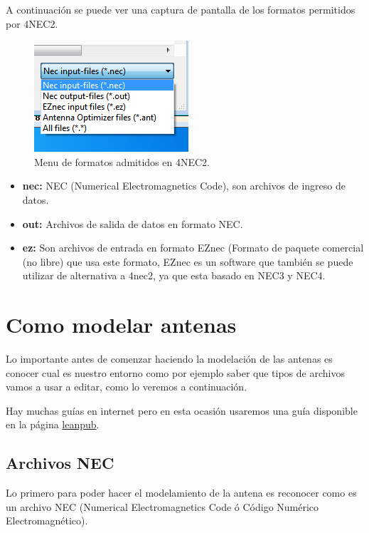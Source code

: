 \documentclass[12pt]{article}
\begin{document}
A continuaci\'on se puede ver una captura de pantalla de los formatos permitidos por 4NEC2.

\begin{figure}[H]
    \centering
    \includegraphics[width=.3\linewidth]{./images/Screenshot_win7_2022-05-31_00:24:55.png}
    \caption{Menu de formatos admitidos en 4NEC2.}
\end{figure}

\begin{itemize}
    \item \textbf{nec:} NEC (Numerical Electromagnetics Code), son archivos de ingreso de datos. 
    \item \textbf{out:} Archivos de salida de datos en formato NEC.
    \item \textbf{ez:} Son archivos de entrada en formato EZnec (Formato de paquete comercial (no libre) que usa este formato, EZnec es un software que tambi\'en se puede utilizar de alternativa a 4nec2, ya que esta basado en NEC3 y NEC4.
\end{itemize}

\section{Como modelar antenas}

Lo importante antes de comenzar haciendo la modelación de las antenas es
conocer cual es nuestro entorno como por ejemplo saber que tipos de archivos
vamos a usar a editar, como lo veremos a continuación.

Hay muchas guías en internet pero en esta ocasión usaremos una guía disponible
en la p\'agina \href{https://leanpub.com/4nec2definitiveguide/read}{leanpub}.

\subsection{Archivos NEC}
Lo primero para poder hacer el modelamiento de la antena es reconocer como es
un archivo NEC (Numerical Electromagnetics Code ó Código Numérico
Electromagnético).
\end{document}
